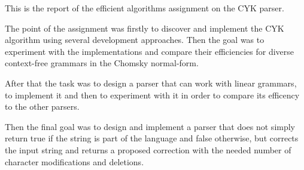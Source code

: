 This is the report of the efficient algorithms assignment on the CYK parser.

The point of the assignment was firstly to discover and implement the CYK algorithm using several development approaches.
Then the goal was to experiment with the implementations and compare their efficiencies for diverse context-free grammars in the Chomsky normal-form.

After that the task was to design a parser that can work with linear grammars, to implement it and then to experiment with it in order to compare its efficency to the other parsers.

Then the final goal was to design and implement a parser that does not simply return true if the string is part of the language and false otherwise, but corrects the input string and returns a proposed correction with the needed number of character modifications and deletions.
